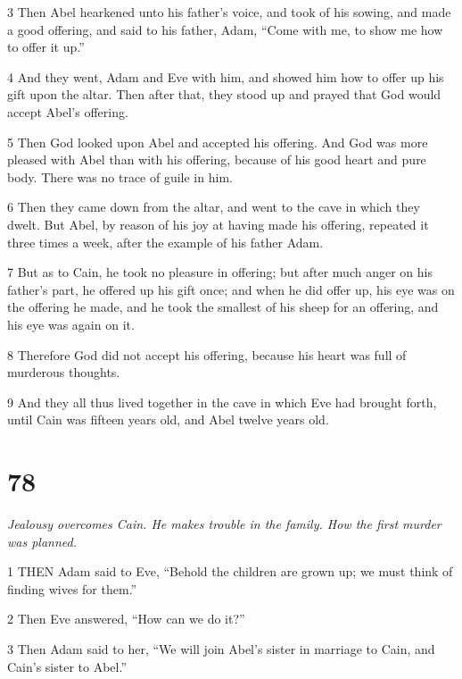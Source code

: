 \par 3 Then Abel hearkened unto his father's voice, and took of his sowing, and made a good offering, and said to his father, Adam, “Come with me, to show me how to offer it up.”

\par 4 And they went, Adam and Eve with him, and showed him how to offer up his gift upon the altar. Then after that, they stood up and prayed that God would accept Abel's offering.

\par 5 Then God looked upon Abel and accepted his offering. And God was more pleased with Abel than with his offering, because of his good heart and pure body. There was no trace of guile in him.

\par 6 Then they came down from the altar, and went to the cave in which they dwelt. But Abel, by reason of his joy at having made his offering, repeated it three times a week, after the example of his father Adam.

\par 7 But as to Cain, he took no pleasure in offering; but after much anger on his father's part, he offered up his gift once; and when he did offer up, his eye was on the offering he made, and he took the smallest of his sheep for an offering, and his eye was again on it.

\par 8 Therefore God did not accept his offering, because his heart was full of murderous thoughts.

\par 9 And they all thus lived together in the cave in which Eve had brought forth, until Cain was fifteen years old, and Abel twelve years old.

\chapter{78}

\par \textit{Jealousy overcomes Cain. He makes trouble in the family. How the first murder was planned.}

\par 1 THEN Adam said to Eve, “Behold the children are grown up; we must think of finding wives for them.”

\par 2 Then Eve answered, “How can we do it?”

\par 3 Then Adam said to her, “We will join Abel's sister in marriage to Cain, and Cain's sister to Abel.”

